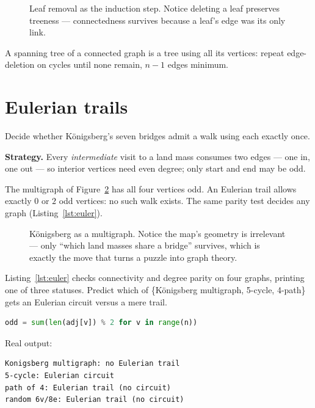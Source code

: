 \begin{figure}[ht]\centering

\caption{Leaf removal as the induction step. Notice deleting a leaf
preserves treeness --- connectedness survives because a leaf's edge was
its only link.}
\label{fig:leaf}
\end{figure}

A spanning tree of a connected graph is a tree using all its vertices:
repeat edge-deletion on cycles until none remain, $n-1$ edges minimum.

\section{Eulerian trails}\label{sec:euler}
\begin{example}\label{ex:konig}
Decide whether Königsberg's seven bridges admit a walk using each
exactly once.
\par\smallskip
\textbf{Strategy.} Every \emph{intermediate} visit to a land mass
consumes two edges --- one in, one out --- so interior vertices need
even degree; only start and end may be odd.
\par\smallskip
\begin{solution}
The multigraph of Figure~\ref{fig:konig} has all four vertices odd.
An Eulerian trail allows exactly $0$ or $2$ odd vertices: no such walk
exists. The same parity test decides any graph (Listing~\ref{lst:euler}).
\end{solution}
\end{example}

\begin{figure}[ht]\centering

\caption{Königsberg as a multigraph. Notice the map's geometry is
irrelevant --- only ``which land masses share a bridge'' survives, which
is exactly the move that turns a puzzle into graph theory.}
\label{fig:konig}
\end{figure}

\begin{checkpoint}
Listing~\ref{lst:euler} checks connectivity and degree parity on
four graphs, printing one of three statuses. Predict which of \{Königsberg multigraph, 5-cycle, 4-path\}
gets an Eulerian circuit versus a mere trail.
\end{checkpoint}

\begin{lstlisting}[language=Python,caption={\texttt{euler\_check.py}:
DFS connectivity + odd-degree count (full script in
\texttt{code/euler\_check.py}).},label={lst:euler}]
odd = sum(len(adj[v]) % 2 for v in range(n))
\end{lstlisting}
Real output:
\begin{lstlisting}[numbers=none]
Konigsberg multigraph: no Eulerian trail
5-cycle: Eulerian circuit
path of 4: Eulerian trail (no circuit)
random 6v/8e: Eulerian trail (no circuit)
\end{lstlisting}

